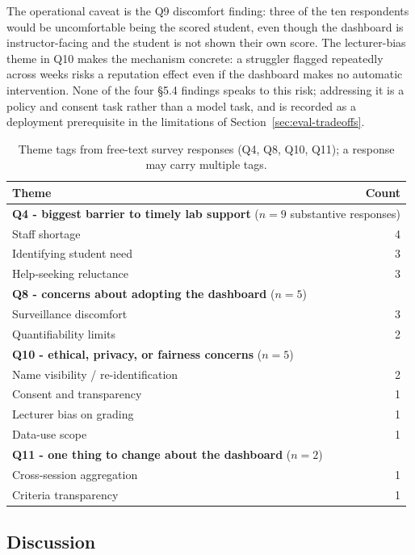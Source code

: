 The operational caveat is the Q9 discomfort finding: three of the ten respondents would be uncomfortable being the scored student, even though the dashboard is instructor-facing and the student is not shown their own score. The lecturer-bias theme in Q10 makes the mechanism concrete: a struggler flagged repeatedly across weeks risks a reputation effect even if the dashboard makes no automatic intervention. None of the four §5.4 findings speaks to this risk; addressing it is a policy and consent task rather than a model task, and is recorded as a deployment prerequisite in the limitations of Section~\ref{sec:eval-tradeoffs}.

\begin{table}[H]
\centering
\caption{Theme tags from free-text survey responses (Q4, Q8, Q10, Q11); a response may carry multiple tags.}
\label{tab:eval-survey-themes}
\begin{tabular}{|l|r|}
\hline
\textbf{Theme} & \textbf{Count} \\
\hline
\multicolumn{2}{|l|}{\textbf{Q4 - biggest barrier to timely lab support} ($n=9$ substantive responses)} \\
\hline
Staff shortage & 4 \\
Identifying student need & 3 \\
Help-seeking reluctance & 3 \\
\hline
\multicolumn{2}{|l|}{\textbf{Q8 - concerns about adopting the dashboard} ($n=5$)} \\
\hline
Surveillance discomfort & 3 \\
Quantifiability limits & 2 \\
\hline
\multicolumn{2}{|l|}{\textbf{Q10 - ethical, privacy, or fairness concerns} ($n=5$)} \\
\hline
Name visibility / re-identification & 2 \\
Consent and transparency & 1 \\
Lecturer bias on grading & 1 \\
Data-use scope & 1 \\
\hline
\multicolumn{2}{|l|}{\textbf{Q11 - one thing to change about the dashboard} ($n=2$)} \\
\hline
Cross-session aggregation & 1 \\
Criteria transparency & 1 \\
\hline
\end{tabular}
\end{table}

\subsection{Discussion} \label{sec:eval-discussion}

